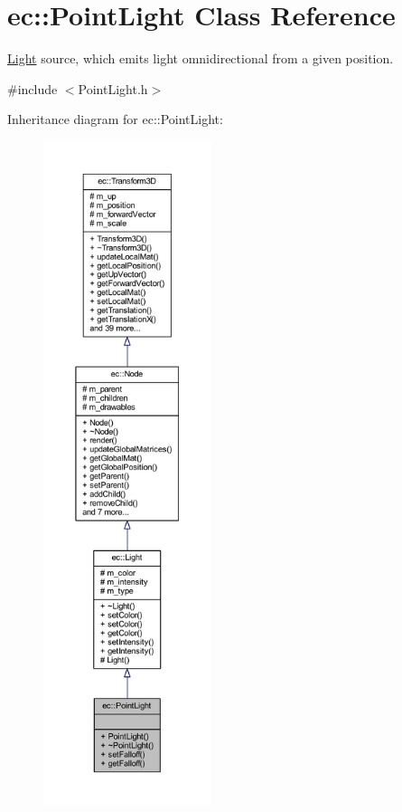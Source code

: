 \hypertarget{classec_1_1_point_light}{}\section{ec\+:\+:Point\+Light Class Reference}
\label{classec_1_1_point_light}


\mbox{\hyperlink{classec_1_1_light}{Light}} source, which emits light omnidirectional from a given position.  




{\ttfamily \#include $<$Point\+Light.\+h$>$}



Inheritance diagram for ec\+:\+:Point\+Light\+:\nopagebreak
\begin{figure}[H]
\begin{center}
\leavevmode
\includegraphics[height=550pt]{classec_1_1_point_light__inherit__graph}
\end{center}
\end{figure}


